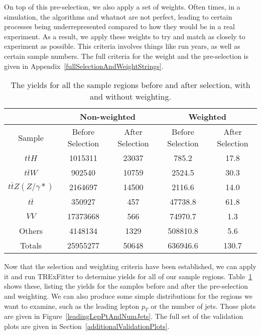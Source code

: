     On top of this pre-selection, we also apply a set of weights. Often times, in a simulation, the algorithms and whatnot are not perfect, leading to certain processes being underrepresented compared to how they would be in a real experiment. As a result, we apply these weights to try and match as closely to experiment as possible. This criteria involves things like run years, as well as certain sample numbers. The full criteria for the weight and the pre-selection is given in Appendix~\ref{fullSelectionAndWeightStrings}.


    \begin{table}[ht!]
        \centering
        \begin{tabular}{|c|c|c|c|c|}
            \hline
             & \multicolumn{2}{c|}{Non-weighted} & \multicolumn{2}{c|}{Weighted} \\ \hline 
            Sample & Before Selection & After Selection & Before Selection & After Selection \\ \hline
            $t\bar{t}H$ & 1015311 & 23037 & 785.2 & 17.8 \\ \hline
            $t\bar{t}W$ & 902540 & 10759 & 2524.5 & 30.3 \\ \hline
            $t\bar{t}Z(Z/\gamma*)$ & 2164697 & 14500 & 2116.6 & 14.0 \\ \hline
            $t\bar{t}$ & 350927 & 457 & 47738.8 & 61.8 \\ \hline
            $VV$ & 17373668 & 566 & 74970.7 & 1.3 \\ \hline
            Others & 4148134 & 1329 & 508810.8 & 5.6 \\ \hline\hline
            Totals & 25955277 & 50648 & 636946.6 & 130.7 \\ \hline
        \end{tabular}
        \caption{The yields for all the sample regions before and after selection, with and without weighting.}
        \label{allYields}
    \end{table}

    Now that the selection and weighting criteria have been established, we can apply it and run TRExFitter to determine yields for all of our sample regions. Table~\ref{allYields} shows these, listing the yields for the samples before and after the pre-selection and weighting. We can also produce some simple distributions for the regions we want to examine, such as the leading lepton $p_T$ or the number of jets. Those plots are given in Figure~\ref{leadingLepPtAndNumJets}. The full set of the validation plots are given in Section~\ref{additionalValidationPlots}.

